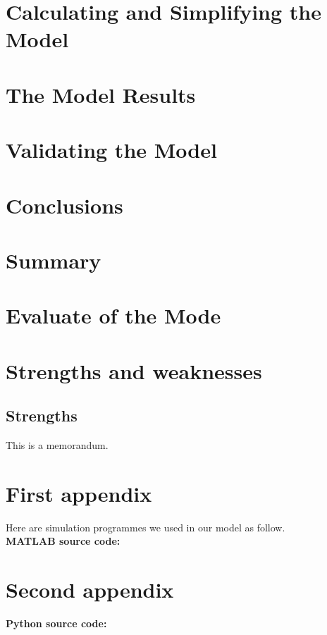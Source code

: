 \documentclass{mcmthesis}  %
\begin{document}
\section{Calculating and Simplifying the Model}  %

\section{The Model Results}  %

\section{Validating the Model}  %

\section{Conclusions}  %

\section{Summary}  %

\section{Evaluate of the Mode}  %

\section{Strengths and weaknesses}  %

\subsection{Strengths}  %

\printbibliography  %


\begin{appendices}  %

\begin{memo}[Memorandum]  %
	This is a memorandum.
\end{memo}  %

\section{First appendix}  %

Here are simulation programmes we used in our model as follow.\\
\textbf{MATLAB source code:}


\section{Second appendix}  %

\textbf{Python source code:}


\end{appendices}  %
\end{document}
